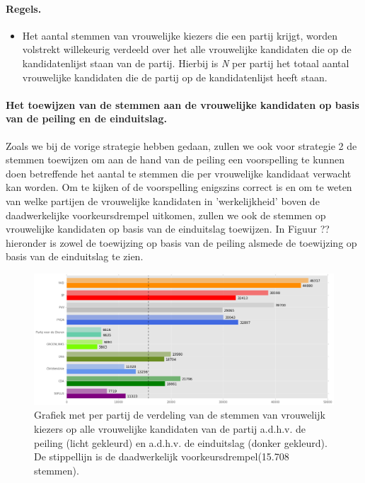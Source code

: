 \paragraph{Regels.}
\begin{itemize}
	\item
Het aantal stemmen van vrouwelijke kiezers die een partij krijgt, worden volstrekt willekeurig verdeeld over het alle vrouwelijke kandidaten die op de kandidatenlijst staan van de partij. Hierbij is \textit{N} per partij het totaal aantal vrouwelijke kandidaten die de partij op de kandidatenlijst heeft staan. 	\\ 	
\end{itemize}	

\paragraph{Het toewijzen van de stemmen aan de vrouwelijke kandidaten op basis van de peiling en de einduitslag.}
Zoals we bij de vorige strategie hebben gedaan, zullen we ook voor strategie 2 de stemmen toewijzen om aan de hand van de peiling een voorspelling te kunnen doen betreffende het aantal te stemmen die per vrouwelijke kandidaat verwacht kan worden. Om te kijken of de voorspelling enigszins correct is en om te weten van welke partijen de vrouwelijke kandidaten in 'werkelijkheid' boven de daadwerkelijke voorkeursdrempel uitkomen, zullen we ook de stemmen op vrouwelijke kandidaten op basis van de einduitslag toewijzen. In Figuur ?? hieronder is zowel de toewijzing op basis van de peiling alsmede de toewijzing op basis van de einduitslag te zien.   



\begin{figure}[H]

	\includegraphics[width=\linewidth]	{stemmen_op_vrouwen_willekeurig_samen.png}

			\caption{Grafiek met per partij de verdeling van de stemmen van vrouwelijk kiezers op alle vrouwelijke kandidaten van de partij a.d.h.v. de peiling (licht gekleurd) en a.d.h.v. de einduitslag (donker gekleurd). De stippellijn is de daadwerkelijk voorkeursdrempel(15.708 stemmen).}

\label{fig:stemmenS2V}
\end{figure}


